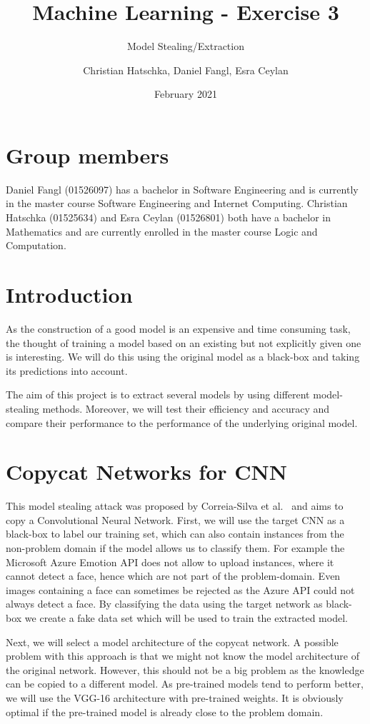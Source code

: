 \documentclass[a4paper,11pt]{article}
\title{Machine Learning - Exercise 3}
\subtitle{Model Stealing/Extraction}
\author{Christian Hatschka, Daniel Fangl, Esra Ceylan}
\date{February 2021}
\begin{document}
\maketitle

\section{Group members}
    Daniel Fangl (01526097) has a bachelor in Software Engineering and is currently in the master course Software Engineering and Internet Computing. Christian Hatschka (01525634) and Esra Ceylan (01526801) both have a bachelor in Mathematics and are currently enrolled in the master course Logic and Computation.
    
\section{Introduction}
    As the construction of a good model is an expensive and time consuming task, the thought of training a model based on an existing but not explicitly given one is interesting. We will do this using the original model as a black-box and taking its predictions into account.
    
    The aim of this project is to extract several models by using different model-stealing methods. Moreover, we will test their efficiency and accuracy and compare their performance to the performance of the underlying original model.
    
\section{Copycat Networks for CNN}\label{sec:copycat}
    This model stealing attack was proposed by Correia-Silva et al.~\cite{copycat} and aims to copy a Convolutional Neural Network. First, we will use the target CNN as a black-box to label our training set, which can also contain instances from the non-problem domain if the model allows us to classify them. For example the Microsoft Azure Emotion API does not allow to upload instances, where it cannot detect a face, hence which are not part of the problem-domain. Even images containing a face can sometimes be rejected as the Azure API could not always detect a face. By classifying the data using the target network as black-box we create a fake data set which will be used to train the extracted model.
    
    Next, we will select a model architecture of the copycat network. A possible problem with this approach is that we might not know the model architecture of the original network. However, this should not be a big problem as the knowledge can be copied to a different model.
    As pre-trained models tend to perform better, we will use the VGG-16 architecture with pre-trained weights. It is obviously optimal if the pre-trained model is already close to the problem domain.
    
\end{document}
